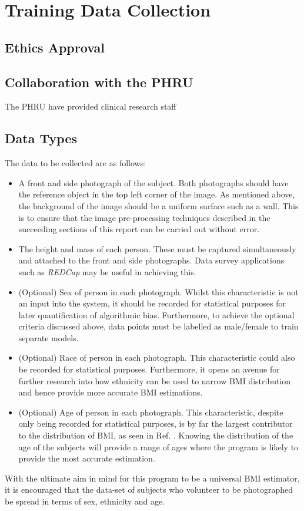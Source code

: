 \documentclass[conference]{IEEEtran}
\begin{document}
\section{Training Data Collection}
\subsection{Ethics Approval}
\subsection{Collaboration with the PHRU}
The PHRU have provided clinical research staff
\subsection{Data Types}
The data to be collected are as follows:
\begin{itemize}
\item A front and side photograph of the subject.
Both photographs should have the reference object in the top left corner of the image.
As mentioned above, the background of the image should be a uniform surface such as a wall.
This is to ensure that the image pre-processing techniques described in the succeeding sections of this report can be carried out without error.
\item The height and mass of each person.
These must be captured simultaneously and attached to the front and side photographs.
Data survey applications such as \textit{REDCap} may be useful in achieving this.
\item (Optional) Sex of person in each photograph.
Whilst this characteristic is not an input into the system, it should be recorded for statistical purposes for later quantification of algorithmic bias.
Furthermore, to achieve the optional criteria discussed above, data points must be labelled as male/female to train separate models.
\item (Optional) Race of person in each photograph.
This characteristic could also be recorded for statistical purposes.
Furthermore, it opens an avenue for further research into how ethnicity can be used to narrow BMI distribution and hence provide more accurate BMI estimations.
\item (Optional) Age of person in each photograph.
This characteristic, despite only being recorded for statistical purposes, is by far the largest contributor to the distribution of BMI, as seen in Ref. \cite{bmiage}.
Knowing the distribution of the age of the subjects will provide a range of ages where the program is likely to provide the most accurate estimation.
\end{itemize}
With the ultimate aim in mind for this program to be a universal BMI estimator, it is encouraged that the data-set of subjects who volunteer to be photographed be spread in terms of sex, ethnicity and age.
\end{document}
